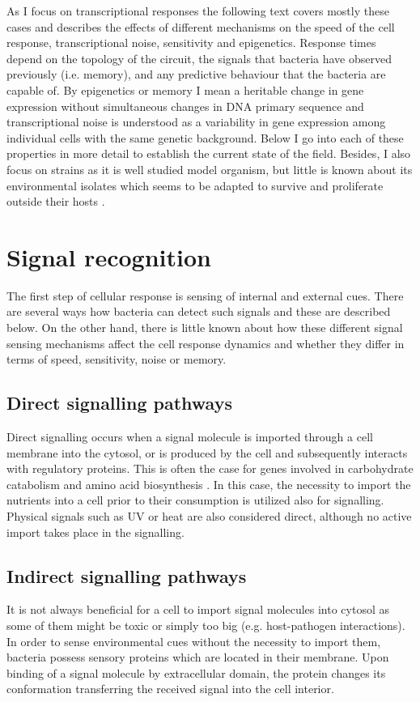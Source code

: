 As I focus on transcriptional responses the following text covers mostly these cases and describes the effects of different mechanisms on the speed of the cell response, transcriptional noise, sensitivity and epigenetics.
Response times depend on the topology of the circuit, the signals that bacteria have observed previously (i.e. memory), and any predictive behaviour that the bacteria are capable of.
By epigenetics or memory I mean a heritable change in gene expression without simultaneous changes in DNA primary sequence and transcriptional noise is understood as a variability in gene expression among individual cells with the same genetic background.
Below I go into each of these properties in more detail to establish the current state of the field.
Besides, I also focus on  strains as it is well studied model organism, but little is known about its environmental isolates which seems to be adapted to survive and proliferate outside their hosts \cite{byappanahalli2004indigenous, ishii2006presence, somorin2016general}.



\section{Signal recognition}
The first step of cellular response is sensing of internal and external cues.
There are several ways how bacteria can detect such signals and these are described below.
On the other hand, there is little known about how these different signal sensing mechanisms affect the cell response dynamics and whether they differ in terms of speed, sensitivity, noise or memory.

\subsection{Direct signalling pathways}
Direct signalling occurs when a signal molecule is imported through a cell membrane into the cytosol, or is produced by the cell and subsequently interacts with regulatory proteins.
This is often the case for genes involved in carbohydrate catabolism and amino acid biosynthesis \cite{charlier1992arginine, weickert1992isorepressor, pittard1996various, wheatley2013structural}.
In this case, the necessity to import the nutrients into a cell prior to their consumption is utilized also for signalling.
Physical signals such as UV or heat are also considered direct, although no active import takes place in the signalling.

\subsection{Indirect signalling pathways}
It is not always beneficial for a cell to import signal molecules into cytosol as some of them might be toxic or simply too big (e.g. host-pathogen interactions).
In order to sense environmental cues without the necessity to import them, bacteria possess sensory proteins which are located in their membrane.
Upon binding of a signal molecule by extracellular domain, the protein changes its conformation transferring the received signal into the cell interior.

